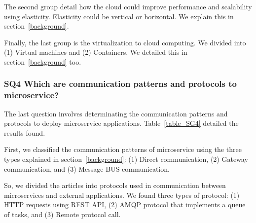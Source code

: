The second group detail how the cloud could improve performance and scalability using elasticity. Elasticity could be vertical or horizontal. We explain this in section~\ref{background}.

Finally, the last group is the virtualization to cloud computing. We divided into (1) Virtual machines and (2) Containers. We detailed this in section~\ref{background} too.

\subsubsection{SQ4 Which are communication patterns and protocols to microservice?}

The last question involves determinating the communication patterns and protocols to deploy microservice applications. Table~\ref{table_SG4} detailed the results found.

First, we classified the communication patterns of microservice using the three types explained in section~\ref{background}: (1) Direct communication, (2) Gateway communication, and (3) Message BUS communication.

So, we divided the articles into protocols used in communication between microservices and external applications. We found three types of protocol: (1) HTTP requests using REST API, (2) AMQP protocol that implements a queue of tasks, and (3) Remote protocol call. 